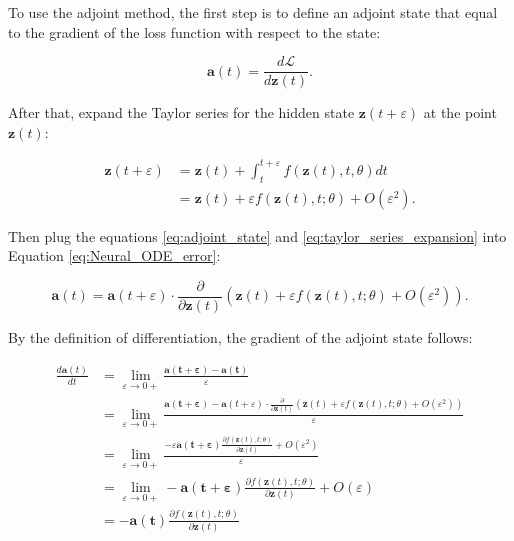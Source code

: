 \documentclass[
	parskip, 			   %
	twoside, 			   %
	DIV=14, 			   %
	BCOR=15.0mm, 		   %
	headsepline, 		   %
	open=right, 		   %
	captions=tableheading, %
	bibliography=totoc,    %
	numbers=noenddot       %
]{scrreprt}
\begin{document}
To use the adjoint method, the first step is to define an adjoint state that equal to the gradient of the loss function with respect to the state:

\begin{equation}
    \label{eq:adjoint_state}
    \mathbf{a}(t) = \frac{d\mathcal{L}}{d\mathbf{z}(t)}.
\end{equation}

After that, expand the Taylor series for the hidden state $\mathbf{z}(t+\varepsilon )$ at the point $\mathbf{z}(t)$:

\begin{equation}
    \label{eq:taylor_series_expansion}
    \begin{aligned}
    \mathbf{z}(t+\varepsilon ) &= \mathbf{z}(t) + \int_{t}^{t+\varepsilon } f(\mathbf{z}(t), t, \theta)dt\\
    &= \mathbf{z}(t) + \varepsilon f(\mathbf{z}(t), t; \theta) + O (\varepsilon ^2).
    \end{aligned}
\end{equation}

Then plug the equations \ref{eq:adjoint_state} and \ref{eq:taylor_series_expansion} into Equation \ref{eq:Neural_ODE_error}:

\begin{equation}
    \label{eq:Neural_ODE_adjoint_state}
    \mathbf{a}(t) = \mathbf{a}(t+\varepsilon ) \cdot \frac{\partial}{\partial \mathbf{z}(t)} (\mathbf{z}(t) + \varepsilon f(\mathbf{z}(t), t; \theta) + O (\varepsilon ^2)) .
\end{equation}

By the definition of differentiation, the gradient of the adjoint state follows:

\begin{equation}
    \label{eq:adjoint_state_gradient_hidden_state}
    \begin{aligned}
        \frac{d\mathbf{a}(t)}{dt} &= \lim_{\varepsilon \to 0+} \frac{\mathbf{a(t+\varepsilon)}-\mathbf{a(t)}}{\varepsilon} \\
        &= \lim_{\varepsilon \to 0+} \frac{\mathbf{a(t+\varepsilon)}-\mathbf{a}(t+\varepsilon ) \cdot \frac{\partial}{\partial \mathbf{z}(t)} (\mathbf{z}(t) + \varepsilon f(\mathbf{z}(t), t; \theta) + O (\varepsilon ^2)) }{\varepsilon}\\
        &= \lim_{\varepsilon \to 0+} \frac{-\varepsilon \mathbf{a(t+\varepsilon)} \frac{\partial f(\mathbf{z}(t), t; \theta)}{\partial \mathbf{z}(t)} + O (\varepsilon ^2)}{\varepsilon}\\
        &= \lim_{\varepsilon \to 0+} - \mathbf{a(t+\varepsilon)} \frac{\partial f(\mathbf{z}(t), t; \theta)}{\partial \mathbf{z}(t)} + O (\varepsilon)\\
        &= - \mathbf{a(t)} \frac{\partial f(\mathbf{z}(t), t; \theta)}{\partial \mathbf{z}(t)}
    \end{aligned}
\end{equation}
\end{document}
